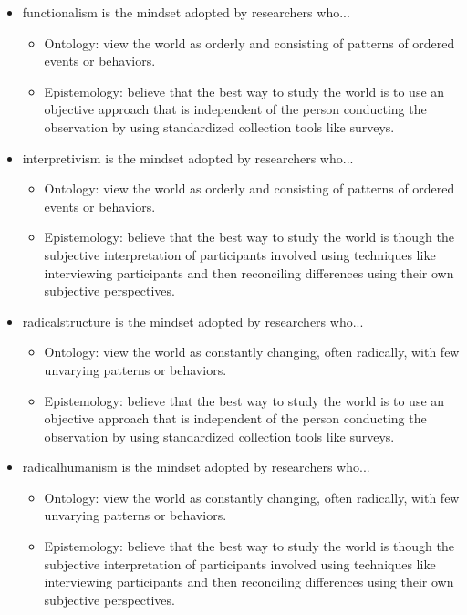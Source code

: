 \begin{itemize}
	\item \Gls{functionalism} is the mindset adopted by researchers who...
	
	\begin{itemize}
		\item Ontology: view the world as orderly and consisting of patterns of ordered events or behaviors.
		\item Epistemology: believe that the best way to study the world is to use an objective approach that is independent of the person conducting the observation by using standardized collection tools like surveys.
	\end{itemize}	

	\item \Gls{interpretivism} is the mindset adopted by researchers who...

	\begin{itemize}
		\item Ontology: view the world as orderly and consisting of patterns of ordered events or behaviors.
		\item Epistemology: believe that the best way to study the world is though the subjective interpretation of participants involved using techniques like interviewing participants and then reconciling differences using their own subjective perspectives.
	\end{itemize}	

	\item \Gls{radicalstructure} is the mindset adopted by researchers who...

	\begin{itemize}
		\item Ontology: view the world as constantly changing, often radically, with few unvarying patterns or behaviors.
		\item Epistemology: believe that the best way to study the world is to use an objective approach that is independent of the person conducting the observation by using standardized collection tools like surveys.
	\end{itemize}	

	\item \Gls{radicalhumanism} is the mindset adopted by researchers who...

	\begin{itemize}
		\item Ontology: view the world as constantly changing, often radically, with few unvarying patterns or behaviors.
		\item Epistemology: believe that the best way to study the world is though the subjective interpretation of participants involved using techniques like interviewing participants and then reconciling differences using their own subjective perspectives.
	\end{itemize}	

\end{itemize}

